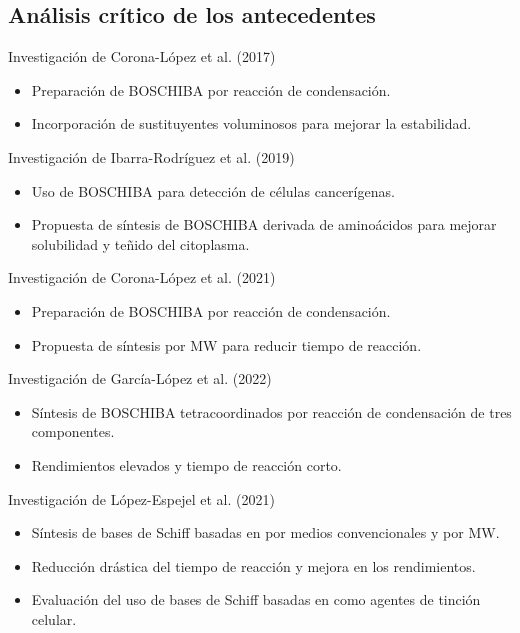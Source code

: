 \documentclass[%
spanish,
mexico]{beamer}
\begin{document}
\subsection{Análisis crítico de los antecedentes}

\begin{frame}{Investigación de Corona-López et al. (2017)}
    \begin{itemize}[<+- | alert@+>]
        \item Preparación de \gls{BOSCHIBA} por reacción de condensación.
        \item Incorporación de sustituyentes voluminosos para mejorar la estabilidad.
    \end{itemize}
\end{frame}

\begin{frame}{Investigación de Ibarra-Rodríguez et al. (2019)}
    \begin{itemize}[<+- | alert@+>]
        \item Uso de \gls{BOSCHIBA} para detección de células cancerígenas.
        \item Propuesta de síntesis de \gls{BOSCHIBA} derivada de aminoácidos para mejorar solubilidad y teñido del citoplasma.
    \end{itemize}
\end{frame}

\begin{frame}{Investigación de Corona-López et al. (2021)}
    \begin{itemize}[<+- | alert@+>]
        \item Preparación de \gls{BOSCHIBA} por reacción de condensación.
        \item Propuesta de síntesis por \gls{MW} para reducir tiempo de reacción.
    \end{itemize}
\end{frame}

\begin{frame}{Investigación de García-López et al. (2022)}
    \begin{itemize}[<+- | alert@+>]
        \item Síntesis de \gls{BOSCHIBA} tetracoordinados por reacción de condensación de tres componentes.
        \item Rendimientos elevados y tiempo de reacción corto.
    \end{itemize}
\end{frame}

\begin{frame}{Investigación de López-Espejel et al. (2021)}
    \begin{itemize}[<+- | alert@+>]
        \item Síntesis de bases de Schiff basadas en  por medios convencionales y por \gls{MW}.
        \item Reducción drástica del tiempo de reacción y mejora en los rendimientos.
        \item Evaluación del uso de bases de Schiff basadas en  como agentes de tinción celular.
    \end{itemize}
\end{frame}
\end{document}
